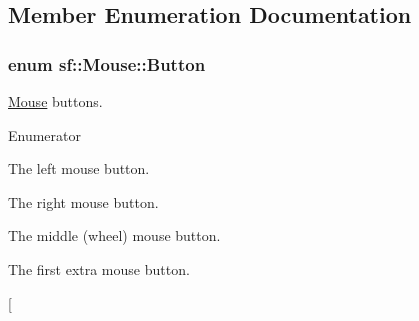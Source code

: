 \subsection{Member Enumeration Documentation}
\hypertarget{classsf_1_1_mouse_a4fb128be433f9aafe66bc0c605daaa90}{
\subsubsection[{Button}]{\setlength{\rightskip}{0pt plus 5cm}enum {\bf sf\-::\-Mouse\-::\-Button}}}\label{classsf_1_1_mouse_a4fb128be433f9aafe66bc0c605daaa90}


\hyperlink{classsf_1_1_mouse}{Mouse} buttons. 

\begin{Desc}
\item[Enumerator]\par
\begin{description}
\item[{\em 
\hypertarget{classsf_1_1_mouse_a4fb128be433f9aafe66bc0c605daaa90a7fedad2e16d5c1dcf61de9eff0dbb501}{Left}\label{classsf_1_1_mouse_a4fb128be433f9aafe66bc0c605daaa90a7fedad2e16d5c1dcf61de9eff0dbb501}
}]The left mouse button. \item[{\em 
\hypertarget{classsf_1_1_mouse_a4fb128be433f9aafe66bc0c605daaa90a64bbf245db73f3b156bc65aa30666831}{Right}\label{classsf_1_1_mouse_a4fb128be433f9aafe66bc0c605daaa90a64bbf245db73f3b156bc65aa30666831}
}]The right mouse button. \item[{\em 
\hypertarget{classsf_1_1_mouse_a4fb128be433f9aafe66bc0c605daaa90abb6be270c8c9398b9a0421258b057b76}{Middle}\label{classsf_1_1_mouse_a4fb128be433f9aafe66bc0c605daaa90abb6be270c8c9398b9a0421258b057b76}
}]The middle (wheel) mouse button. \item[{\em 
\hypertarget{classsf_1_1_mouse_a4fb128be433f9aafe66bc0c605daaa90a3af65e31680f6b1881897691a42cc934}{X\-Button1}\label{classsf_1_1_mouse_a4fb128be433f9aafe66bc0c605daaa90a3af65e31680f6b1881897691a42cc934}
}]The first extra mouse button. \item[{\em 
}
\end{description}
\end{Desc}
